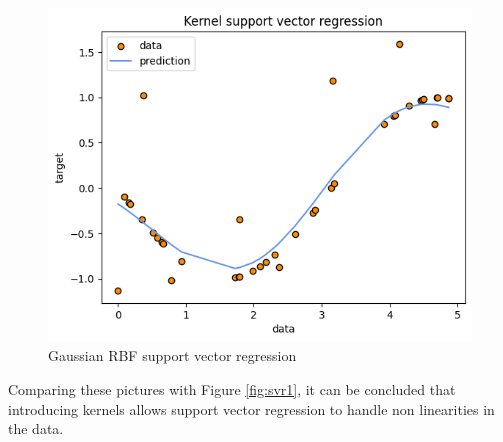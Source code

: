 \begin{figure}
    \includegraphics[width=\textwidth]{images/svr3.png}
    \caption{Gaussian RBF support vector regression}
    \label{fig:svr3}
\end{figure}
Comparing these pictures with Figure \ref{fig:svr1}, it can be concluded that introducing kernels allows support vector regression to handle non linearities in the data.
